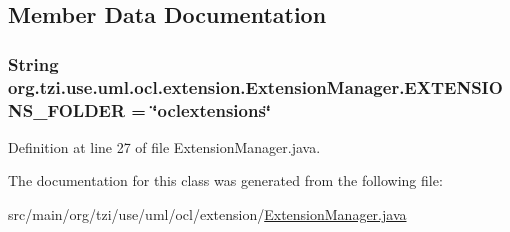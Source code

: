 \subsection{Member Data Documentation}
\hypertarget{classorg_1_1tzi_1_1use_1_1uml_1_1ocl_1_1extension_1_1_extension_manager_a0a193bfedc1de5b133c6a8581853de22}{
\subsubsection[{E\-X\-T\-E\-N\-S\-I\-O\-N\-S\-\_\-\-F\-O\-L\-D\-E\-R}]{\setlength{\rightskip}{0pt plus 5cm}String org.\-tzi.\-use.\-uml.\-ocl.\-extension.\-Extension\-Manager.\-E\-X\-T\-E\-N\-S\-I\-O\-N\-S\-\_\-\-F\-O\-L\-D\-E\-R = \char`\"{}oclextensions\char`\"{}\hspace{0.3cm}{\ttfamily [static]}}}\label{classorg_1_1tzi_1_1use_1_1uml_1_1ocl_1_1extension_1_1_extension_manager_a0a193bfedc1de5b133c6a8581853de22}


Definition at line 27 of file Extension\-Manager.\-java.



The documentation for this class was generated from the following file\-:\begin{DoxyCompactItemize}
\item 
src/main/org/tzi/use/uml/ocl/extension/\hyperlink{_extension_manager_8java}{Extension\-Manager.\-java}\end{DoxyCompactItemize}
